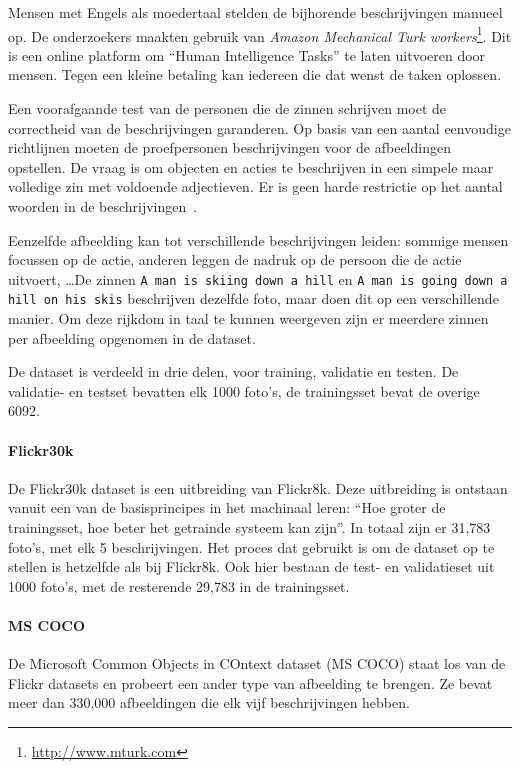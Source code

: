 Mensen met Engels als moedertaal stelden de bijhorende beschrijvingen manueel op. De onderzoekers maakten gebruik van \emph{Amazon Mechanical Turk workers}\footnote{\url{http://www.mturk.com}}. Dit is een online platform om ``Human Intelligence Tasks'' te laten uitvoeren door mensen. Tegen een kleine betaling kan iedereen die dat wenst de taken oplossen. 

Een voorafgaande test van de personen die de zinnen schrijven moet de correctheid van de beschrijvingen garanderen. Op basis van een aantal eenvoudige richtlijnen moeten de proefpersonen beschrijvingen voor de afbeeldingen opstellen. De vraag is om objecten en acties te beschrijven in een simpele maar volledige zin met voldoende adjectieven. Er is geen harde restrictie op het aantal woorden in de beschrijvingen~\cite{Hockenmaier2014}.

Eenzelfde afbeelding kan tot verschillende beschrijvingen leiden: sommige mensen focussen op de actie, anderen leggen de nadruk op de persoon die de actie uitvoert, \ldots De zinnen \texttt{A man is skiing down a hill} en \texttt{A man is going down a hill on his skis} beschrijven dezelfde foto, maar doen dit op een verschillende manier. Om deze rijkdom in taal te kunnen weergeven zijn er meerdere zinnen per afbeelding opgenomen in de dataset.

De dataset is verdeeld in drie delen, voor training, validatie en testen. De validatie- en testset bevatten elk 1000 foto's, de trainingsset bevat de overige 6092.


\paragraph{Flickr30k}
\label{par:Flickr30k}
De Flickr30k dataset\cite{Young2014} is een uitbreiding van Flickr8k. Deze uitbreiding is ontstaan vanuit een van de basisprincipes in het machinaal leren: ``Hoe groter de trainingsset, hoe beter het getrainde systeem kan zijn''. In totaal zijn er 31,783 foto's, met elk 5 beschrijvingen. Het proces dat gebruikt is om de dataset op te stellen is hetzelfde als bij Flickr8k. Ook hier bestaan de test- en validatieset uit 1000 foto's, met de resterende 29,783 in de trainingsset.


\paragraph{MS COCO}
\label{par:MS COCO}
De Microsoft Common Objects in COntext dataset (MS COCO)\cite{Lin2014} staat los van de Flickr datasets en probeert een ander type van afbeelding te brengen. Ze bevat meer dan 330,000 afbeeldingen die elk vijf beschrijvingen hebben. 

